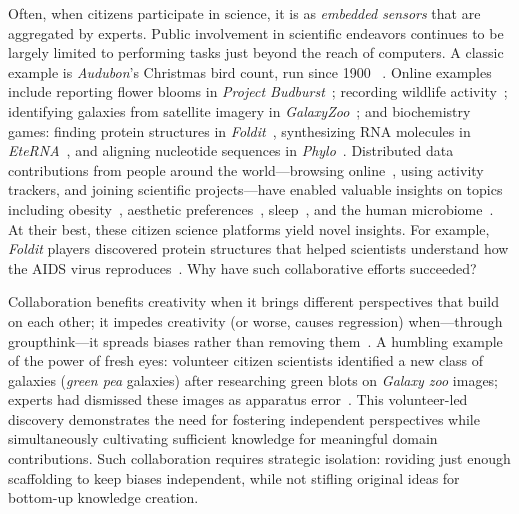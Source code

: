 Often, when citizens participate in science, it is as \textit{embedded sensors} that 
are aggregated by experts. Public involvement in scientific endeavors continues
to be largely limited to performing tasks just beyond the reach of computers.
A classic example is \textit{Audubon}’s Christmas bird count, run since 1900
~\cite{Audubon2016}. Online examples include reporting flower blooms in
\textit{Project Budburst}~\cite{BoulderColorado2016}; recording wildlife activity~\cite{Faridani2009a};
identifying galaxies from satellite imagery in \textit{GalaxyZoo}~\cite{Zooniverse2007}; 
and biochemistry games: finding protein structures in \textit{Foldit}~\cite{Cooper2010}, 
synthesizing RNA molecules in \textit{EteRNA}~\cite{Lee2014}, and aligning 
nucleotide sequences in \textit{Phylo}~\cite{Kawrykow2012}. Distributed 
data contributions from people around the world—browsing online~\cite{Coviello2014}, using activity trackers, and joining scientific projects—have enabled valuable insights on topics including 
obesity~\cite{Althoff2017}, aesthetic preferences~\cite{Reinecke2014a}, sleep~\cite{F.lux2019}, and the human microbiome~\cite{McDonald2018a}. At their
best, these citizen science platforms yield novel insights.
For example, \textit{Foldit} players discovered protein structures
that helped scientists understand how the AIDS virus reproduces~\cite{Coren2011}. Why have such collaborative efforts succeeded?


Collaboration benefits creativity when it brings different
 perspectives that build on each other; it impedes creativity (or worse, causes regression) 
when—through groupthink—it spreads biases rather than removing them~\cite{starbird2014rumors}. 
A humbling example of the power of fresh eyes: volunteer citizen scientists identified a new class of 
galaxies (\textit{green pea} galaxies) after researching green blots on \textit{Galaxy zoo} images; 
experts had dismissed these images as apparatus error~\cite{cardamone2009galaxy}.
This volunteer-led discovery demonstrates the need for fostering independent perspectives 
while simultaneously cultivating sufficient knowledge for meaningful domain contributions. 
Such collaboration requires strategic isolation: roviding just enough scaffolding to keep 
biases independent, while not stifling original ideas for bottom-up knowledge creation.




